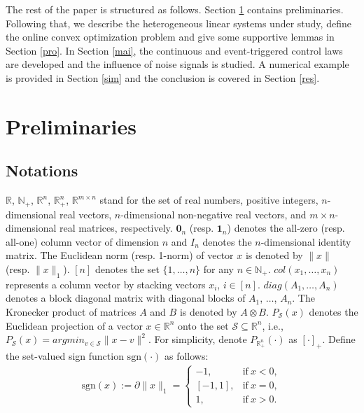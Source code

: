 \documentclass[final,5p,times,twocolumn,authoryear]{elsarticle}
\newcommand{\sign}[1]{\mathrm{sgn}(#1)}
\begin{document}
	The rest of the paper is structured as follows. Section \ref{pre} contains preliminaries. Following that, we describe the heterogeneous linear systems under study, define the online convex optimization problem and give some supportive lemmas in Section \ref{pro}. In Section \ref{mai}, the continuous and event-triggered control laws are developed and the influence of noise signals is studied.  A numerical example is provided in Section \ref{sim} and the conclusion is covered in Section \ref{res}.

\section{Preliminaries}\label{pre}

\subsection{Notations}
	$\mathbb{R}$, $\mathbb{N}_+$, $\mathbb{R}^n$, $\mathbb{R}_+^n$, $\mathbb{R}^{m\times n}$ stand for the set of real numbers, positive integers, $n$-dimensional real vectors, $n$-dimensional non-negative real vectors, and $m\times n$-dimensional real matrices, respectively. $\boldsymbol0_n$ (resp. $\boldsymbol1_n$) denotes the all-zero (resp. all-one) column  vector  of dimension $n$ and $I_n$ denotes the $n$-dimensional identity matrix. The Euclidean norm (resp. 1-norm) of vector $x$ is denoted by $\|x\|$ (resp. $\|x\|_1$). $[n]$ denotes the set $\{1,\dots,n\}$ for any $n\in\mathbb{N}_+$. $col(x_1,\dots,x_n)$ represents a column vector by stacking vectors $x_i$, $i\in[n]$. $diag(A_1,\dots,A_n)$ denotes a block diagonal matrix with diagonal blocks of $A_1$, $\dots$, $A_n$. The Kronecker product of matrices $A$ and $B$ is denoted by $A\otimes B$.
	$P_\mathcal{S}(x)$ denotes the Euclidean projection of a vector $x\in \mathbb{R}^n$ onto the set $\mathcal{S} \subseteq \mathbb{R}^n$, i.e., 
	$P_\mathcal{S}(x)=argmin_{v\in\mathcal{S}}\|x-v\|^2$.
	For simplicity, denote $P_{\mathbb{R}_+^n}(\cdot)$ as $[\cdot]_+$.	
	 Define the set-valued sign function $\mathrm{sgn}(\cdot)$ as follows:
	\begin{align*}
		\sign{x}:=\partial\|x\|_1=
		\begin{cases}
			-1,&\mathrm{if}\  x<0,\\
			[-1,1],&\mathrm{if}\  x=0,\\
			1,&\mathrm{if}\  x>0.
		\end{cases}
	\end{align*}
\end{document}
